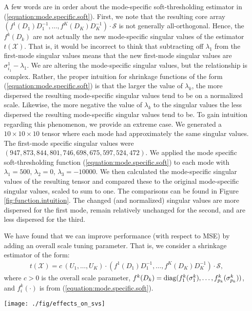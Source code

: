 A few words are in order about the mode-specific soft-thresholding
estimator in (\ref{equation:mode.specific.soft}). First, we note that
the resulting core array $(f^1(D_1)D_1^{-1},\ldots,f^K(D_K)D_K^{-1})
\cdot \mathcal{S}$ is not generally all-orthogonal. Hence, the
$f^k(D_k)$ are not actually the new mode-specific singular values of
the estimator $t(\mathcal{X})$. That is, it would be incorrect to
think that subtracting off $\lambda_1$ from the first-mode singular
values means that the new first-mode singular values are
$\sigma_{i_1}^1 - \lambda_1$. We are altering the mode-specific
singular values, but the relationship is complex. Rather, the proper
intuition for shrinkage functions of the form
(\ref{equation:mode.specific.soft}) is that the larger the value of
$\lambda_k$, the more dispersed the resulting mode-specific singular
values tend to be on a normalized scale. Likewise, the more negative
the value of $\lambda_k$ to the singular values the less dispersed
the resulting mode-specific singular values tend to be. To gain
intuition regarding this phenomenon, we provide an extreme case. We
generated a $10 \times 10 \times 10$ tensor where each mode had
approximately the same singular values. The first-mode specific
singular values were $(947, 873, 844, 801, 746, 698, 675, 597, 524,
472)$. We applied the mode specific soft-thresholding function
(\ref{equation:mode.specific.soft}) to each mode with $\lambda_1 =
500$, $\lambda_2 = 0$, $\lambda_3 = -10000$. We then calculated the
mode-specific singular values of the resulting tensor and compared
these to the original mode-specific singular values, scaled to sum to
one. The comparisons can be found in Figure
\ref{fig:function.intuition}. The changed (and normalized) singular
values are more dispersed for the first mode, remain relatively
unchanged for the second, and are less dispersed for the third.



We have found that we can improve performance (with respect to MSE) by
adding an overall scale tuning parameter. That is, we consider a
shrinkage estimator of the form:
\begin{align}
  \label{equation:msst.est}
  t(\mathcal{X}) = c\ (U_1,\ldots,U_K)\cdot(f^1(D_1)D_1^{-1},\ldots,f^K(D_K)D_K^{-1})\cdot\mathcal{S},
\end{align}
where $c > 0$ is the overall scale parameter,
$f^k(D_k) =
\operatorname*{diag}(f_1^k(\sigma_1^k),\ldots,f_{p_k}^k(\sigma_{p_k}^k))$,
and $f_i^k(\cdot)$ is from (\ref{equation:mode.specific.soft}).

\begin{figure*}
\begin{center}
\texttt{[image: ./fig/effects\_on\_svs]}
\caption{Singular values for the three modes, before and after
  shrinkage, normalized to sum to one.}
\label{fig:function.intuition}
\end{center}
\end{figure*}
